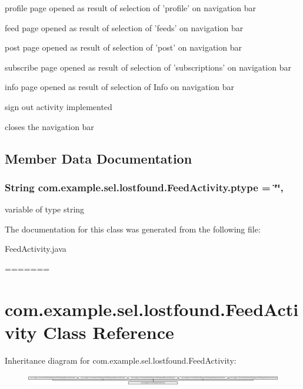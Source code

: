 profile page opened as result of selection of 'profile' on navigation bar

feed page opened as result of selection of 'feeds' on navigation bar

post page opened as result of selection of 'post' on navigation bar

subscribe page opened as result of selection of 'subscriptions' on navigation bar

info page opened as result of selection of Info on navigation bar

sign out activity implemented

closes the navigation bar 

\subsection{Member Data Documentation}
\hypertarget{classcom_1_1example_1_1sel_1_1lostfound_1_1FeedActivity_a485e807a263274d664ce60fae23ebb45}{
\subsubsection[{ptype}]{\setlength{\rightskip}{0pt plus 5cm}String com.\-example.\-sel.\-lostfound.\-Feed\-Activity.\-ptype = \char`\"{}\char`\"{}\hspace{0.3cm}{\ttfamily [static]}, {\ttfamily [protected]}}}\label{classcom_1_1example_1_1sel_1_1lostfound_1_1FeedActivity_a485e807a263274d664ce60fae23ebb45}
variable of type string 

The documentation for this class was generated from the following file\-:\begin{DoxyCompactItemize}
\item 
Feed\-Activity.\-java\end{DoxyCompactItemize}
=======
\hypertarget{classcom_1_1example_1_1sel_1_1lostfound_1_1FeedActivity}{\section{com.\-example.\-sel.\-lostfound.\-Feed\-Activity \-Class \-Reference}
\label{classcom_1_1example_1_1sel_1_1lostfound_1_1FeedActivity}
}
\-Inheritance diagram for com.\-example.\-sel.\-lostfound.\-Feed\-Activity\-:\begin{figure}[H]
\begin{center}
\leavevmode
\includegraphics[height=0.486957cm]{classcom_1_1example_1_1sel_1_1lostfound_1_1FeedActivity}
\end{center}
\end{figure}
